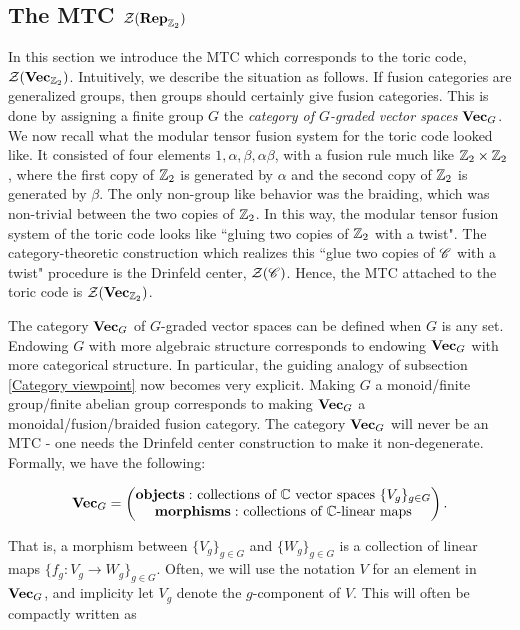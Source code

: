 \documentclass{article}
\theoremstyle{definition}
\numberwithin{figure}{section}
\begin{document}
\begin{enumerate}[\thesection .1.]
\subsection{The MTC $\mathcal{Z}(\bold{Rep}_{\mathbb{Z}_2})$}
\label{VecZ2 MTC}

In this section we introduce the MTC which corresponds to the toric code, $\mathcal{Z}(\bold{Vec}_{\mathbb{Z}_2})$. Intuitively, we describe the situation as follows. If fusion categories are generalized groups, then groups should certainly give fusion categories. This is done by assigning a finite group $G$ the \textit{category of $G$-graded vector spaces} $\bold{Vec}_G$. We now recall what the modular tensor fusion system for the toric code looked like. It consisted of four elements $1,\alpha,\beta,\alpha\beta$, with a fusion rule much like $\mathbb{Z}_2\times \mathbb{Z}_2$, where the first copy of $\mathbb{Z}_2$ is generated by $\alpha$ and the second copy of $\mathbb{Z}_2$ is generated by $\beta$. The only non-group like behavior was the braiding, which was non-trivial between the two copies of $\mathbb{Z}_2$. In this way, the modular tensor fusion system of the toric code looks like ``gluing two copies of $\mathbb{Z}_2$ with a twist". The category-theoretic construction which realizes this ``glue two copies of $\mathscr{C}$ with a twist" procedure is the Drinfeld center, $\mathcal{Z}(\mathscr{C})$. Hence, the MTC attached to the toric code is $\mathcal{Z}(\bold{Vec}_{\mathbb{Z}_2})$.

The category $\bold{Vec}_G$ of $G$-graded vector spaces can be defined when $G$ is any set. Endowing $G$ with more algebraic structure corresponds to endowing $\bold{Vec}_G$ with more categorical structure. In particular, the guiding analogy of subsection \ref{Category viewpoint} now becomes very explicit. Making $G$ a monoid/finite group/finite abelian group corresponds to making $\bold{Vec}_G$ a monoidal/fusion/braided fusion category. The category $\bold{Vec}_G$ will never be an MTC - one needs the Drinfeld center construction to make it non-degenerate. Formally, we have the following:

$$\bold{Vec}_G=
\begin{pmatrix}
\bold{objects: }\text{ collections of $\mathbb{C}$ vector spaces }\{V_g\}_{g\in G}\\
\bold{morphisms: }\text{ collections of $\mathbb{C}$-linear maps}
\end{pmatrix}.$$

That is, a morphism between $\{V_g\}_{g\in G}$ and $\{W_g\}_{g\in G}$ is a collection of linear maps $\{f_g:V_g\to W_g\}_{g\in G}.$ Often, we will use the notation $V$ for an element in $\bold{Vec}_G$, and implicity let $V_g$ denote the $g$-component of $V$. This will often be compactly written as


\end{enumerate}
\end{document}
